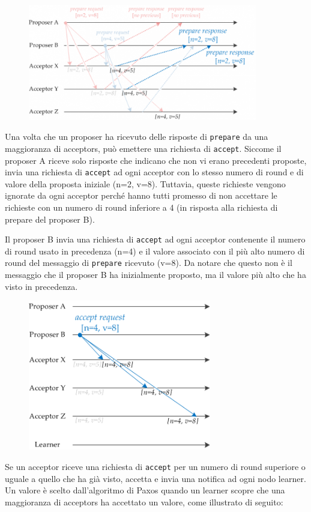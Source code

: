 \begin{figure}[ht]
    \centering
    \includegraphics[width=10cm]{./Images/cap2/2.9.png}
    \label{fig:image2.9}
\end{figure}
\FloatBarrier
Una volta che un proposer ha ricevuto delle risposte di \texttt{prepare} da una maggioranza di acceptors, può emettere una richiesta di \texttt{accept}. Siccome il proposer A riceve solo risposte che indicano che non vi erano precedenti proposte,  invia una richiesta di \texttt{accept} ad ogni acceptor con lo stesso numero di round e di valore della proposta iniziale (n=2, v=8). Tuttavia, queste richieste vengono ignorate da ogni acceptor perché hanno tutti promesso di non accettare le richieste con un numero di round inferiore a 4 (in risposta alla richiesta di prepare del proposer B).


\vspace{5mm}

Il proposer B invia una richiesta di \texttt{accept} ad ogni acceptor contenente il numero di round usato in precedenza (n=4) e il valore associato con il più alto numero di round  del messaggio di \texttt{prepare} ricevuto (v=8). Da notare che questo non è il messaggio che il proposer B ha inizialmente proposto, ma il valore più alto che ha visto in precedenza.

\begin{figure}[ht]
    \centering
    \includegraphics[width=8cm]{./Images/cap2/2.10.png}
    \label{fig:image2.10}
\end{figure}
\FloatBarrier
Se un acceptor riceve una richiesta di \texttt{accept} per un numero di round superiore o uguale  a quello che ha già visto, accetta e invia una notifica ad ogni nodo learner. Un valore è scelto dall’algoritmo di Paxos quando un learner scopre che una maggioranza di acceptors ha accettato un valore, come illustrato di seguito:


